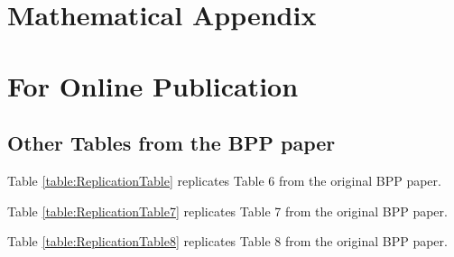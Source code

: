 \documentclass[AER]{AEA}
\begin{document}



\appendix

\section{Mathematical Appendix}

\newpage
\section{For Online Publication}





\subsection{Other Tables from the BPP paper} \label{table_appendix}

Table \ref{table:ReplicationTable} replicates Table 6 from the original BPP paper.

 

Table \ref{table:ReplicationTable7} replicates Table 7 from the original BPP paper.

 

Table \ref{table:ReplicationTable8} replicates Table 8 from the original BPP paper.
\end{document}
